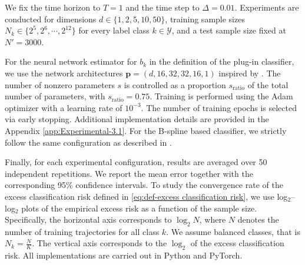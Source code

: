 \documentclass{article}
\theoremstyle{plain}
\theoremstyle{definition}
\theoremstyle{remark}
\newcommand{\calY}{\mathcal{Y}}
\newcommand{\rr}{\color{red}}
\newcommand{\black}{\color{black}}
\begin{document}
We fix the time horizon to $T = 1$ and the time step to $\Delta = 0.01$. Experiments are conducted for dimensions $d \in  \{1, 2, 5, 10, 50\}$, training sample sizes $ N_k \in \{ 2^5, 2^6, \cdots, 2^{12}\}$ for every label class $k\in\calY$, and a test sample size fixed at $N'=3000$. 

For the neural network estimator for $b_k$ in the definition of the plug-in classifier,  we use the  network architectures $\mathbf{p}= (d, 16, 32, 32, 16, 1)$ inspired by \citet{zhao2025drift}. The number of nonzero parameters $s$ is controlled as a proportion $s_{\mathrm{ratio}}$ of the total number of parameters, with $s_{\text{ratio}} = 0.75$. Training is performed using the Adam optimizer with a learning rate of $10^{-3}$. The number of training epochs is selected via early stopping. %
Additional implementation details are provided in the Appendix \ref{app:Experimental-3.1}.  For the B-spline based classifier, we strictly follow the same configuration as described in \citet[Section 3]{Denis2024}. %




Finally, for each experimental configuration, results are averaged over 50 independent repetitions. We report the mean error together with the corresponding 95\% confidence intervals. To study the convergence rate of the excess classification risk defined in \eqref{eq:def-excess classification risk}, we use log$_2$--log$_2$ plots of the empirical excess risk as a function of the sample size. Specifically, the horizontal axis corresponds to $\log_2N$, where $N$ denotes the number of training trajectories for all class $k$. We assume balanced classes, that is $N_k=\tfrac{N}{K}$. The vertical axis corresponds to the $\log_2$ of the excess classification risk. All implementations are carried out in Python and PyTorch.







\end{document}
